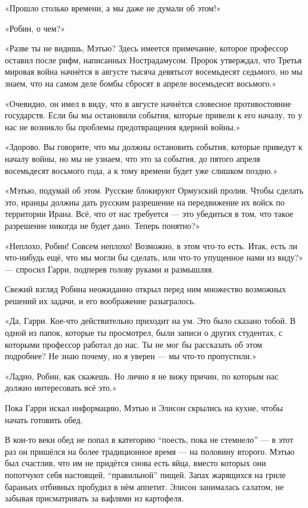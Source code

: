 \documentclass[a5paper, 9pt,
final, openany, twoside=true]{memoir}
\begin{document}
«Прошло столько времени, а мы даже не думали об этом!»

«Робин, о чем?»

«Разве ты не видишь, Мэтью? Здесь имеется примечание, которое профессор оставил после рифм, написанных Нострадамусом. Пророк утверждал, что Третья мировая война начнётся в августе тысяча девятьсот восемьдесят седьмого, но мы знаем, что на самом деле бомбы сбросят в апреле восемьдесят восьмого.»

«Очевидно, он имел в виду, что в августе начнётся словесное противостояние государств. Если бы мы остановили события, которые привели к его началу, то у нас не возникло бы проблемы предотвращения ядерной войны.»

«Здорово. Вы говорите, что мы должны остановить события, которые приведут к началу войны, но мы не узнаем, что это за события, до пятого апреля восемьдесят восьмого года, а к тому времени будет уже слишком поздно.»

«Мэтью, подумай об этом. Русские блокируют Ормузский пролив. Чтобы сделать это, иранцы должны дать русским разрешение на передвижение их войск по территории Ирана. Всё, что от нас требуется — это убедиться в том, что такое разрешение никогда не будет дано. Теперь понятно?»

«Неплохо, Робин! Совсем неплохо! Возможно, в этом что-то есть. Итак, есть ли что-нибудь ещё, что мы могли бы сделать, или что-то упущенное нами из виду?» — спросил Гарри, подперев голову руками и размышляя.

Свежий взгляд Робина неожиданно открыл перед ним множество возможных решений их задачи, и его воображение разыгралось.

«Да, Гарри. Кое-что действительно приходит на ум. Это было сказано тобой. В одной из папок, которые ты просмотрел, были записи о других студентах, с которыми профессор работал до нас. Ты не мог бы рассказать об этом подробнее? Не знаю почему, но я уверен — мы что-то пропустили.»

«Ладно, Робин, как скажешь. Но лично я не вижу причин, по которым нас должно интересовать всё это.»

Пока Гарри искал информацию, Мэтью и Элисон скрылись на кухне, чтобы начать готовить обед.

В кои-то веки обед не попал в категорию ``поесть, пока не стемнело'' — в этот раз он пришёлся на более традиционное время — на половину второго. Мэтью был счастлив, что им не придётся снова есть яйца, вместо которых они попотчуют себя настоящей, ``правильной'' пищей. Запах жарящихся на гриле бараньих отбивных пробудил в нём аппетит. Элисон занималась салатом, не забывая присматривать за вафлями из картофеля.\bigskip
\end{document}
